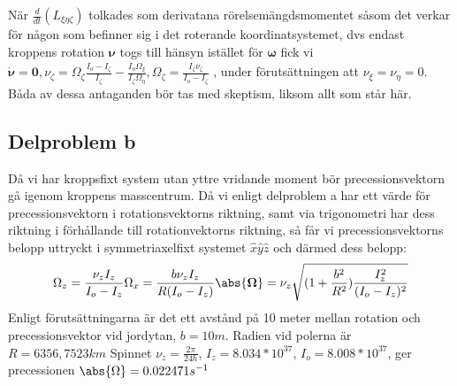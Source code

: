 \documentclass[12pt,a4paper]{article}
\begin{document}
När $\frac{d}{dt}(L_{\xi\eta\zeta})$ tolkades som derivatana rörelsemängdsmomentet såsom det verkar för någon som befinner sig i det roterande koordinatsystemet, dvs endast kroppens rotation $\boldsymbol{\nu}$ togs till hänsyn istället för $\boldsymbol{\omega}$ fick vi $\dot{\boldsymbol{\nu}} = \mathbf{0} , \nu_{\zeta} = \Omega_{\zeta}\frac{I_o-I_{\zeta}}{I_{\zeta}} - \frac{I_o \dot{\Omega}_{\xi}}{I_{\zeta} \Omega_{\eta}} , \Omega_{\zeta} = \frac{I_{\zeta} \nu_{\zeta}}{I_o-I_{\zeta}}$ , under förutsättningen att $\nu_{\xi}=\nu_{\eta}=0$. Båda av dessa antaganden bör tas med skeptism, liksom allt som står här.

\subsection{Delproblem b}
Då vi har kroppsfixt system utan yttre vridande moment bör precessionsvektorn gå igenom kroppens masscentrum.  Då vi enligt delproblem a har ett värde för precessionsvektorn i rotationsvektorns riktning, samt via trigonometri har dess riktning i förhållande till rotationvektorns riktning, så får vi precessionsvektorns belopp uttryckt i symmetriaxelfixt systemet $\hat{x}\hat{y}\hat{z}$ och därmed dess belopp:
\begin{equation*}
\Omega_z = \frac{\nu_z I_z}{I_o-I_z}
\Omega_x = \frac{b \nu_z I_z}{R(I_o-I_z)}
\abs{\boldsymbol{\Omega}}=\nu_z \sqrt{(1+\frac{b^2}{R^2})\frac{I_z^2}{(I_o-I_z)^2}} 
\end{equation*}
Enligt förutsättningarna är det ett avstånd på 10 meter mellan rotation och precessionsvektor vid jordytan, $b=10m$. Radien vid polerna är $R= 6356,7523 km$
Spinnet $\nu_z = \frac{2\pi}{24h}$, $I_z=8.034*10^{37}$, $I_o=8.008*10^{37}$, ger precessionen $\abs{\Omega} = 0.022471 s^{-1}$
\\

\end{document}
